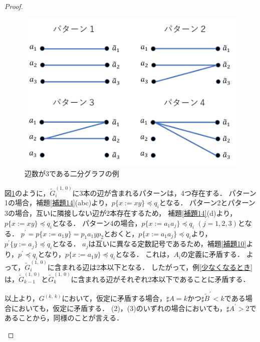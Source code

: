 \begin{proof}
\begin{enumerate}
\begin{enumerate}
\begin{figure}[t]
\centering
\includegraphics[width=\linewidth]{figs/BipartiteGraph-NumEdges-3.png}
\caption{辺数が3である二分グラフの例}
\label{辺3におけるパターン}
\end{figure}

図\ref{辺3におけるパターン}のように，$\tilde{G}^{(1,~0)}_{i}$に3本の辺が含まれるパターンは，4つ存在する．
パターン1の場合，補題\ref{補題14}(abc)より，$p \{ x:=xy \} \preceq q_{i}$となる．
パターン2とパターン3の場合，互いに隣接しない辺が2本存在するため，
補題\ref{補題14}(d)より，$p \{ x:=xy \} \preceq q_{i}$となる．
パターン4の場合，$p \{ x:=a_{1}a_{j} \} \preceq q_{i}$ $(j=1,2,3)$となる．
$p^{\prime} = p \{ x:=a_{1}y \} = p_{1}a_{1}yp_{2}$とおくと，$p \{ x:=a_{1}a_{j} \} \preceq q_{i}$より，$p^{\prime} \{ y:=a_{j} \} \preceq q_{i}$となる．
$a_{j}$は互いに異なる定数記号であるため，補題\ref{補題10}より，$p^{\prime} \preceq q_{i}$となり，$p \{ x:=a_{1}y \} \preceq q_{i}$となる．
これは，$A_{i}$の定義に矛盾する．
よって，$\tilde{G}^{(1,~0)}_{i}$に含まれる辺は2本以下となる．
したがって，例\ref{少なくなるとき}は，$\tilde{G}^{(1,~0)}_{k-1}$と$\tilde{G}^{(1,~0)}_{k}$に含まれる辺がそれぞれ2本以下であることに矛盾する．

以上より，$G^{(k,~k)}$において，仮定に矛盾する場合，$\sharp A=k$かつ$\sharp \tilde{B}^{\prime} < k$である場合においても，仮定に矛盾する．
(2)，(3)のいずれの場合においても，$\sharp A^{\prime} > 2$であることから，同様のことが言える．


\end{enumerate}
\end{enumerate}
\end{proof}
